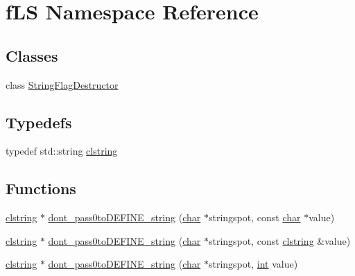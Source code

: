 \hypertarget{namespacefLS}{}\section{f\+LS Namespace Reference}
\label{namespacefLS}
\subsection*{Classes}
\begin{DoxyCompactItemize}
\item 
class \hyperlink{classfLS_1_1StringFlagDestructor}{String\+Flag\+Destructor}
\end{DoxyCompactItemize}
\subsection*{Typedefs}
\begin{DoxyCompactItemize}
\item 
typedef std\+::string \hyperlink{namespacefLS_a1b41ccd11a207a35ef8eae177682761c}{clstring}
\end{DoxyCompactItemize}
\subsection*{Functions}
\begin{DoxyCompactItemize}
\item 
\hyperlink{namespacefLS_a1b41ccd11a207a35ef8eae177682761c}{clstring} $\ast$ \hyperlink{namespacefLS_a7b998aa64c0a75c9396664c980b13d59}{dont\+\_\+pass0to\+D\+E\+F\+I\+N\+E\+\_\+string} (\hyperlink{CMakeCache_8txt_afe71f11dacb15682cdc012f7208e6e09}{char} $\ast$stringspot, const \hyperlink{CMakeCache_8txt_afe71f11dacb15682cdc012f7208e6e09}{char} $\ast$value)
\item 
\hyperlink{namespacefLS_a1b41ccd11a207a35ef8eae177682761c}{clstring} $\ast$ \hyperlink{namespacefLS_abfa9ab46a77798407f455dd9a918b7ec}{dont\+\_\+pass0to\+D\+E\+F\+I\+N\+E\+\_\+string} (\hyperlink{CMakeCache_8txt_afe71f11dacb15682cdc012f7208e6e09}{char} $\ast$stringspot, const \hyperlink{namespacefLS_a1b41ccd11a207a35ef8eae177682761c}{clstring} \&value)
\item 
\hyperlink{namespacefLS_a1b41ccd11a207a35ef8eae177682761c}{clstring} $\ast$ \hyperlink{namespacefLS_a2a5af3561f35c8936d3b2adce260db89}{dont\+\_\+pass0to\+D\+E\+F\+I\+N\+E\+\_\+string} (\hyperlink{CMakeCache_8txt_afe71f11dacb15682cdc012f7208e6e09}{char} $\ast$stringspot, \hyperlink{CMakeCache_8txt_a79a3d8790b2588b09777910863574e09}{int} value)
\end{DoxyCompactItemize}


